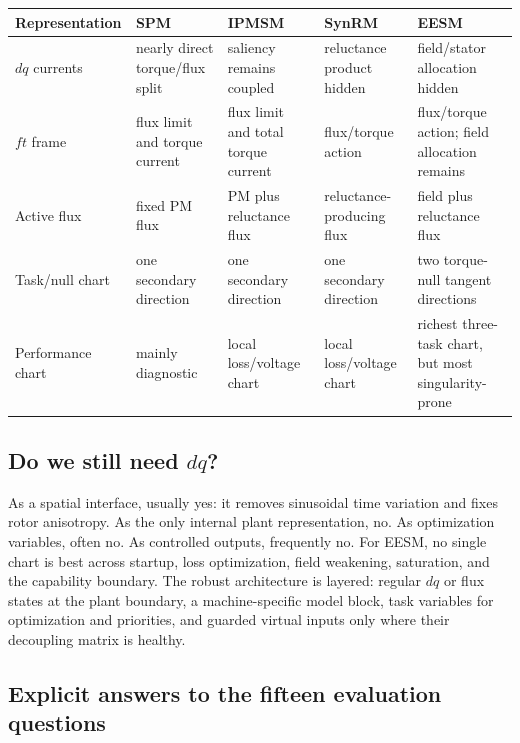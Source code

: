 \begin{standalonetable}
\label{tab:machine-representation-map}
\small
\begin{tabularx}{\linewidth}{lXXXX}
\toprule
Representation & SPM & IPMSM & SynRM & EESM\\
\midrule
\(dq\) currents & nearly direct torque/flux split & saliency remains coupled & reluctance product hidden & field/stator allocation hidden\\
\(ft\) frame & flux limit and torque current & flux limit and total torque current & flux/torque action & flux/torque action; field allocation remains\\
Active flux & fixed PM flux & PM plus reluctance flux & reluctance-producing flux & field plus reluctance flux\\
Task/null chart & one secondary direction & one secondary direction & one secondary direction & two torque-null tangent directions\\
Performance chart & mainly diagnostic & local loss/voltage chart & local loss/voltage chart & richest three-task chart, but most singularity-prone\\
\bottomrule
\end{tabularx}
\end{standalonetable}

\subsection{Do we still need \texorpdfstring{\(dq\)}{dq}?}

As a spatial interface, usually yes: it removes sinusoidal time variation and
fixes rotor anisotropy. As the only internal plant representation, no. As
optimization variables, often no. As controlled outputs, frequently no. For
EESM, no single chart is best across startup, loss optimization, field
weakening, saturation, and the capability boundary. The robust architecture
is layered: regular \(dq\) or flux states at the plant boundary, a
machine-specific model block, task variables for optimization and priorities,
and guarded virtual inputs only where their decoupling matrix is healthy.

\subsection{Explicit answers to the fifteen evaluation questions}

